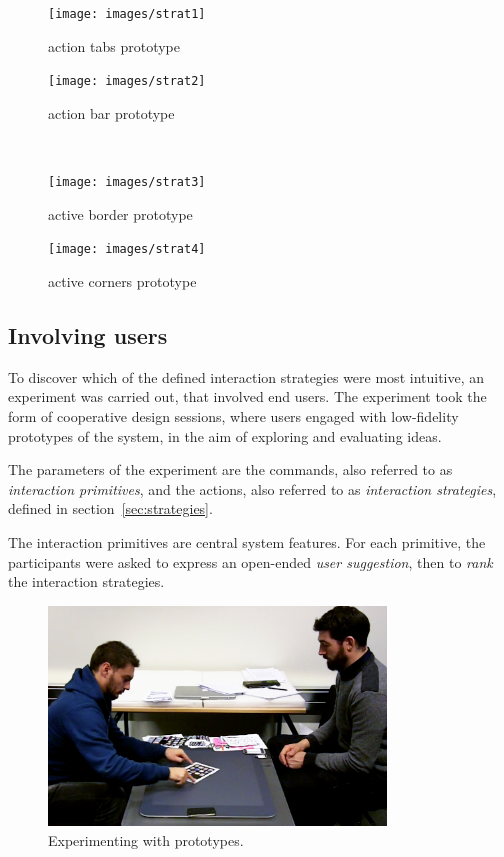 \begin{figure}[ht]
\begin{minipage}[b]{0.5\linewidth}
\centering
\texttt{[image: images/strat1]}
\caption{action tabs prototype}
\label{fig:strat1}
\end{minipage}
\hspace{0.5cm}
\begin{minipage}[b]{0.5\linewidth}
\centering
\texttt{[image: images/strat2]}
\caption{action bar prototype}
\label{fig:strat2}
\end{minipage}
\hfill\\
\begin{minipage}[b]{0.5\linewidth}
\centering
\texttt{[image: images/strat3]}
\caption{active border prototype}
\label{fig:strat3}
\end{minipage}
\hspace{0.5cm}
\begin{minipage}[b]{0.5\linewidth}
\centering
\texttt{[image: images/strat4]}
\caption{active corners prototype}
\label{fig:strat4}
\end{minipage}
\end{figure}

\subsection{Involving users}

To discover which of the defined interaction strategies were most intuitive, an experiment was carried out, that involved end users.
The experiment took the form of cooperative design sessions, where users engaged with low-fidelity prototypes of the system, in the aim of exploring and evaluating ideas.

The parameters of the experiment are the commands, also referred to as \emph{interaction primitives}, and the actions, also referred to as \emph{interaction strategies}, defined in section~\ref{sec:strategies}.

The interaction primitives are central system features.
For each primitive, the participants were asked to express an open-ended \emph{user suggestion}, then to \emph{rank} the interaction strategies.

\begin{figure}[htb]
  \centering
    \includegraphics[width=0.8\textwidth]{images/studyScreenshot}
  \caption{Experimenting with prototypes.}
  \label{studyScreenshot}
\end{figure}


